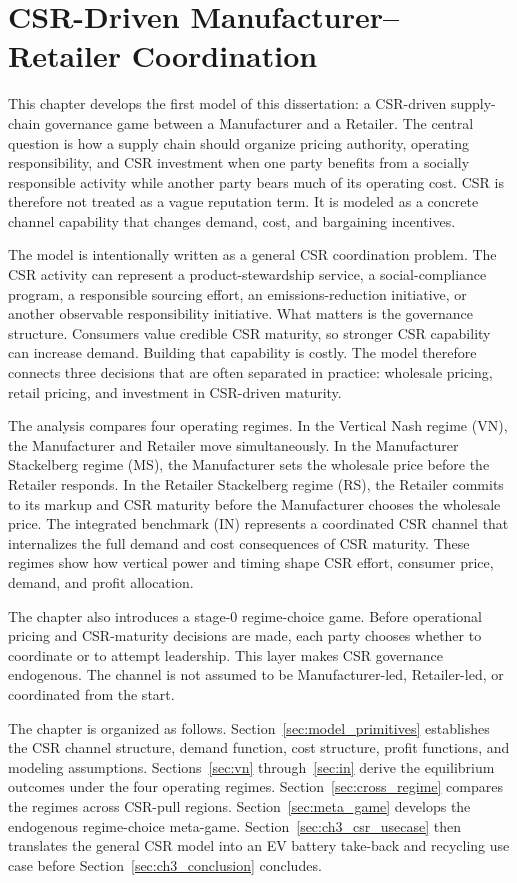 \chapter{CSR-Driven Manufacturer--Retailer Coordination}
\label{chap:model1}

This chapter develops the first model of this dissertation: a CSR-driven supply-chain governance game between a Manufacturer and a Retailer. The central question is how a supply chain should organize pricing authority, operating responsibility, and CSR investment when one party benefits from a socially responsible activity while another party bears much of its operating cost. CSR is therefore not treated as a vague reputation term. It is modeled as a concrete channel capability that changes demand, cost, and bargaining incentives.

The model is intentionally written as a general CSR coordination problem. The CSR activity can represent a product-stewardship service, a social-compliance program, a responsible sourcing effort, an emissions-reduction initiative, or another observable responsibility initiative. What matters is the governance structure. Consumers value credible CSR maturity, so stronger CSR capability can increase demand. Building that capability is costly. The model therefore connects three decisions that are often separated in practice: wholesale pricing, retail pricing, and investment in CSR-driven maturity.

The analysis compares four operating regimes. In the Vertical Nash regime (VN), the Manufacturer and Retailer move simultaneously. In the Manufacturer Stackelberg regime (MS), the Manufacturer sets the wholesale price before the Retailer responds. In the Retailer Stackelberg regime (RS), the Retailer commits to its markup and CSR maturity before the Manufacturer chooses the wholesale price. The integrated benchmark (IN) represents a coordinated CSR channel that internalizes the full demand and cost consequences of CSR maturity. These regimes show how vertical power and timing shape CSR effort, consumer price, demand, and profit allocation.

The chapter also introduces a stage-0 regime-choice game. Before operational pricing and CSR-maturity decisions are made, each party chooses whether to coordinate or to attempt leadership. This layer makes CSR governance endogenous. The channel is not assumed to be Manufacturer-led, Retailer-led, or coordinated from the start.

The chapter is organized as follows. Section~\ref{sec:model_primitives} establishes the CSR channel structure, demand function, cost structure, profit functions, and modeling assumptions. Sections~\ref{sec:vn} through~\ref{sec:in} derive the equilibrium outcomes under the four operating regimes. Section~\ref{sec:cross_regime} compares the regimes across CSR-pull regions. Section~\ref{sec:meta_game} develops the endogenous regime-choice meta-game. Section~\ref{sec:ch3_csr_usecase} then translates the general CSR model into an EV battery take-back and recycling use case before Section~\ref{sec:ch3_conclusion} concludes.

